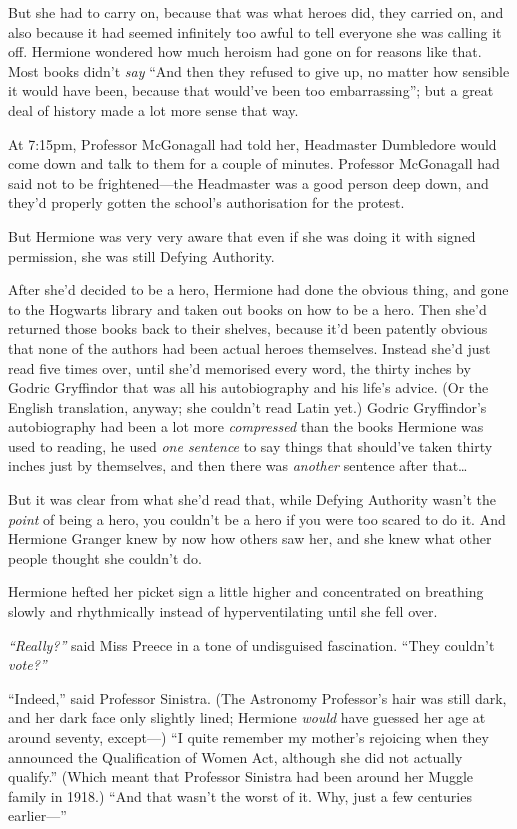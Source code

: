 But she had to carry on, because that was what heroes did, they carried
on, and also because it had seemed infinitely too awful to tell everyone
she was calling it off. Hermione wondered how much heroism had gone on
for reasons like that. Most books didn't \emph{say} ``And then they
refused to give up, no matter how sensible it would have been, because
that would've been too embarrassing''; but a great deal of history made
a lot more sense that way.

At 7:15pm, Professor McGonagall had told her, Headmaster Dumbledore
would come down and talk to them for a couple of minutes. Professor
McGonagall had said not to be frightened---the Headmaster was a good
person deep down, and they'd properly gotten the school's authorisation
for the protest.

But Hermione was very very aware that even if she was doing it with
signed permission, she was still Defying Authority.

After she'd decided to be a hero, Hermione had done the obvious thing,
and gone to the Hogwarts library and taken out books on how to be a
hero. Then she'd returned those books back to their shelves, because
it'd been patently obvious that none of the authors had been actual
heroes themselves. Instead she'd just read five times over, until she'd
memorised every word, the thirty inches by Godric Gryffindor that was
all his autobiography and his life's advice. (Or the English
translation, anyway; she couldn't read Latin yet.) Godric Gryffindor's
autobiography had been a lot more \emph{compressed} than the books
Hermione was used to reading, he used \emph{one sentence} to say things
that should've taken thirty inches just by themselves, and then there
was \emph{another} sentence after that\ldots{}

But it was clear from what she'd read that, while Defying Authority
wasn't the \emph{point} of being a hero, you couldn't be a hero if you
were too scared to do it. And Hermione Granger knew by now how others
saw her, and she knew what other people thought she couldn't do.

Hermione hefted her picket sign a little higher and concentrated on
breathing slowly and rhythmically instead of hyperventilating until she
fell over.

\emph{``Really?''} said Miss Preece in a tone of undisguised
fascination. ``They couldn't \emph{vote?''}

``Indeed,'' said Professor Sinistra. (The Astronomy Professor's hair was
still dark, and her dark face only slightly lined; Hermione \emph{would}
have guessed her age at around seventy, except---) ``I quite remember my
mother's rejoicing when they announced the Qualification of Women Act,
although she did not actually qualify.'' (Which meant that Professor
Sinistra had been around her Muggle family in 1918.) ``And that wasn't
the worst of it. Why, just a few centuries earlier---''

